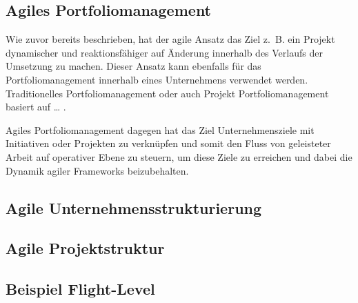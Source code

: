 \subsection{Agiles Portfoliomanagement}
Wie zuvor bereits beschrieben, hat der agile Ansatz das Ziel z. B. ein Projekt dynamischer und reaktionsfähiger auf Änderung innerhalb des Verlaufs der Umsetzung zu machen. Dieser Ansatz kann ebenfalls für das Portfoliomanagement innerhalb eines Unternehmens verwendet werden. Traditionelles Portfoliomanagement oder auch Projekt Portfoliomanagement basiert auf … \cite{}.

Agiles Portfoliomanagement dagegen hat das Ziel Unternehmensziele mit Initiativen oder Projekten zu verknüpfen und somit den Fluss von geleisteter Arbeit auf operativer Ebene zu steuern, um diese Ziele zu erreichen und dabei die Dynamik agiler Frameworks beizubehalten. \cite{}


\subsection{Agile Unternehmensstrukturierung}

\subsection{Agile Projektstruktur}

\subsection{Beispiel Flight-Level}

